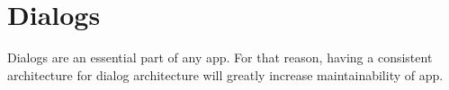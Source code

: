 \maketitle{}
\section{ Dialogs }

Dialogs are an essential part of any app. For that reason, having a consistent
architecture for dialog architecture will greatly increase maintainability of
app.

